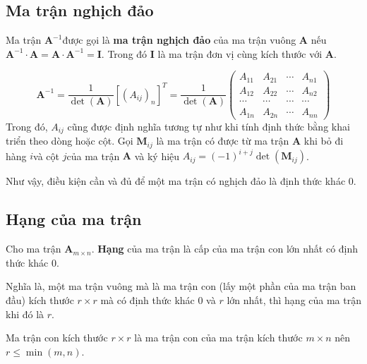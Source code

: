 \subsection*{Ma trận nghịch đảo}

\begin{definition} 
    Ma trận $\bm{A}^{-1}$​ được gọi là \textbf{ma trận nghịch đảo} của ma trận vuông $\bm{A}$ nếu $\bm{A}^{-1} \cdot \bm{A} = \bm{A} \cdot \bm{A}^{-1} = \bm{I}$​. Trong đó $\bm{I}$ là ma trận đơn vị cùng kích thước với $\bm{A}$.
\end{definition}

\begin{equation}
    \bm{A}^{-1}=\frac{1}{\det(\bm{A})}[(A_{ij})_n]^T=\frac{1}{\det(\bm{A})}\begin{pmatrix} A_{11} & A_{21} & \cdots & A_{n1} \\ A_{12} & A_{22} & \cdots & A_{n2} \\ \cdots & \cdots & \cdots & \cdots \\ A_{1n} & A_{2n} & \cdots & A_{nn} \end{pmatrix}
\end{equation}
Trong đó, $A_{ij}$ cũng được định nghĩa tương tự như khi tính định thức bằng khai triển theo dòng hoặc cột. Gọi $\bm{M}_{ij}$ là ma trận có được từ ma trận $\bm{A}$ khi bỏ đi hàng $i$​ và cột $j$​ của ma trận $\bm{A}$ và ký hiệu $A_{ij}=(-1)^{i+j} \det (\bm{M}_{ij})$.

Như vậy, điều kiện cần và đủ để một ma trận có nghịch đảo là định thức khác 0.

\subsection*{Hạng của ma trận}

\begin{definition}
    Cho ma trận $\mathbf{A}_{m \times n}$. \textbf{Hạng} của ma trận là cấp của ma trận con lớn nhất có định thức khác 0.
\end{definition}

Nghĩa là, một ma trận vuông mà là ma trận con (lấy một phần của ma trận ban đầu) kích thước $r \times r$ mà có định thức khác 0 và $r$ lớn nhất, thì hạng của ma trận khi đó là $r$. 

\begin{remark}
    Ma trận con kích thước $r \times r$ là ma trận con của ma trận kích thước $m \times n$ nên $r \leqslant \min(m, n)$.
\end{remark}

